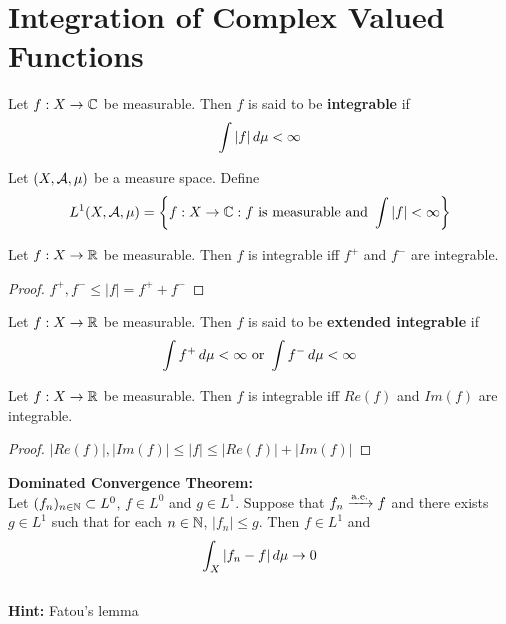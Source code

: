 \documentclass{book}
\begin{document}
	
	
	
	
	
	
	\newpage
	\section{Integration of Complex Valued Functions}
	
	\begin{defn}  
		Let $f:X \rightarrow \mathbb{C}$ be measurable. Then $f$ is said to be \textbf{integrable} if $$\int |f| \, d \mu < \infty$$
	\end{defn}
	
	\begin{defn}  
		Let $(X, \mathcal{A}, \mu)$ be a measure space. Define $$L^1(X, \mathcal{A}, \mu) = \bigg \{f:X \rightarrow \mathbb{C} : f \text{ is measurable and } \int |f| < \infty \bigg \}$$
	\end{defn}
	
	\begin{ex} 
		Let $f:X \rightarrow \mathbb{R}$ be measurable. Then $f$ is integrable iff $f^+$ and $f^-$ are integrable. 
	\end{ex}
	
	\begin{proof}
		$f^+,f^- \leq |f| = f^+ + f^-$
	\end{proof}
	
	\begin{defn}  
		Let $f:X \rightarrow \mathbb{R}$ be measurable. Then $f$ is said to be \textbf{extended integrable} if $$\int f^+ \, d \mu  < \infty \text{ or } \int f^- \, d \mu < \infty$$
	\end{defn}
	
	\begin{ex} 
		Let $f:X \rightarrow \mathbb{R}$ be measurable. Then $f$ is integrable iff $Re(f)$ and $Im(f)$ are integrable.
	\end{ex}
	
	\begin{proof}
		$|Re(f)|, |Im(f)| \leq |f| \leq |Re(f)| + |Im(f)|$
	\end{proof}
	
	\begin{ex}  \textbf{Dominated Convergence Theorem:}\\
		Let $(f_n)_{n \in \mathbb{N}} \subset L^0$, $f \in L^0$ and $g \in L^1$. Suppose that $f_n \xrightarrow{\text{a.e.}} f$ and there exists $g \in L^1$ such that for each $n \in \mathbb{N}$, $|f_n| \leq g$. Then $f \in L^1$ and $$\int_X |f_n - f| \, d \mu \rightarrow 0$$ \\
		\textbf{Hint:} Fatou's lemma
	\end{ex}
	
\end{document}
